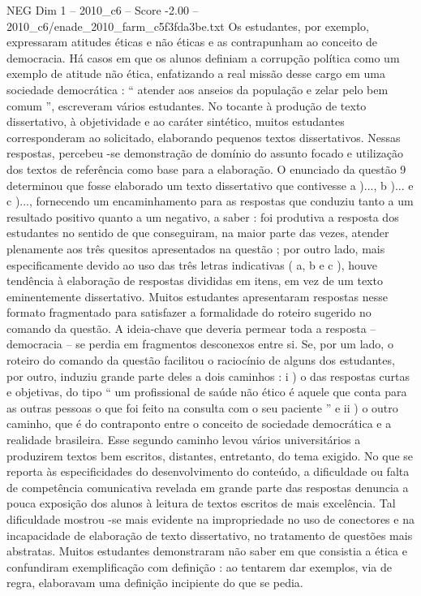 \begin{textsample}{NEG Dim 1 – 2010\_c6 – Score -2.00 – 2010\_c6/enade\_2010\_farm\_c5f3fda3be.txt}
Os estudantes, por exemplo, expressaram atitudes éticas e não éticas e as contrapunham ao conceito de democracia.
Há casos em que os alunos definiam a corrupção política como um exemplo de atitude não ética, enfatizando a real missão desse cargo em uma sociedade democrática : “ atender aos anseios da população e zelar pelo bem comum ”, escreveram vários estudantes.
No tocante à produção de texto dissertativo, à objetividade e ao caráter sintético, muitos estudantes corresponderam ao solicitado, elaborando pequenos textos dissertativos.
Nessas respostas, percebeu -se demonstração de domínio do assunto focado e utilização dos textos de referência como base para a elaboração.
O enunciado da questão 9 determinou que fosse elaborado um texto dissertativo que contivesse a )..., b )... e c )..., fornecendo um encaminhamento para as respostas que conduziu tanto a um resultado positivo quanto a um negativo, a saber : foi produtiva a resposta dos estudantes no sentido de que conseguiram, na maior parte das vezes, atender plenamente aos três quesitos apresentados na questão ; por outro lado, mais especificamente devido ao uso das três letras indicativas ( a, b e c ), houve tendência à elaboração de respostas divididas em itens, em vez de um texto eminentemente dissertativo.
Muitos estudantes apresentaram respostas nesse formato fragmentado para satisfazer a formalidade do roteiro sugerido no comando da questão.
A ideia-chave que deveria permear toda a resposta – democracia – se perdia em fragmentos desconexos entre si.
Se, por um lado, o roteiro do comando da questão facilitou o raciocínio de alguns dos estudantes, por outro, induziu grande parte deles a dois caminhos : i ) o das respostas curtas e objetivas, do tipo “ um profissional de saúde não ético é aquele que conta para as outras pessoas o que foi feito na consulta com o seu paciente ” e ii ) o outro caminho, que é do contraponto entre o conceito de sociedade democrática e a realidade brasileira.
Esse segundo caminho levou vários universitários a produzirem textos bem escritos, distantes, entretanto, do tema exigido.
No que se reporta às especificidades do desenvolvimento do conteúdo, a dificuldade ou falta de competência comunicativa revelada em grande parte das respostas denuncia a pouca exposição dos alunos à leitura de textos escritos de mais excelência.
Tal dificuldade mostrou -se mais evidente na impropriedade no uso de conectores e na incapacidade de elaboração de texto dissertativo, no tratamento de questões mais abstratas.
Muitos estudantes demonstraram não saber em que consistia a ética e confundiram exemplificação com definição : ao tentarem dar exemplos, via de regra, elaboravam uma definição incipiente do que se pedia.

\end{textsample}
